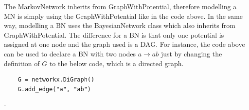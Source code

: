The MarkovNetwork inherits from GraphWithPotential, therefore modelling a MN is simply using the GraphWithPotential like in the code above.
In the same way, modelling a BN uses the BayesianNetwork class which also inherits from GraphWithPotential.
The difference for a BN is that only one potential is assigned at one node and the graph used is a DAG.
For instance, the code above can be used to declare a BN with two nodes $a \rightarrow ab$ just by changing the definition of $G$ to the below code, which is a directed graph.
\begin{verbatim}
    G = networkx.DiGraph()
    G.add_edge("a", "ab")
\end{verbatim}- 

%
